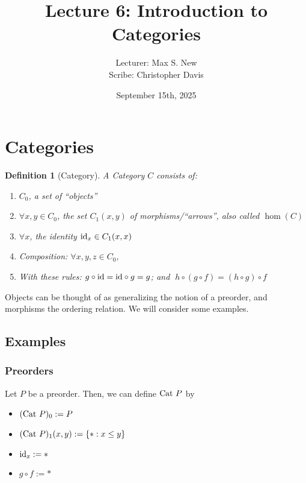 \documentclass[12pt]{article}
\newtheorem{definition}{Definition}
\begin{document}
\title{Lecture 6: Introduction to Categories}
\author{Lecturer: Max S. New\\ Scribe: Christopher Davis}
\date{September 15th, 2025}
\maketitle



\section{Categories}

\begin{definition}[Category]
A Category $C$ consists of:
\begin{enumerate}
    \item $C_0$, a set of ``objects''
    \item $\forall x,y \in C_0$, the set $C_1(x,y)$ of morphisms/``arrows'', also called $\hom(C)$
    \item $\forall x$, the identity $\text{\textup{id}}_x \in C_1(x,x)$
    \item Composition: $\forall x,y,z \in C_0$,
    \begin{mathpar}
    \end{mathpar}
    \item With these rules: $g \circ \textup{id} = \textup{id} \circ g = g$; and $\;h \circ (g \circ f) = (h \circ g) \circ f$
\end{enumerate}

\end{definition}

Objects can be thought of as generalizing the notion of a preorder, and morphisms the ordering relation. We will consider some examples.


\subsection{Examples}

\subsubsection{Preorders}
Let $P$ be a preorder. Then, we can define $\textmd{Cat } P$ by

\begin{itemize}
    \item $(\textmd{Cat } P)_0 := P$
    \item $(\textmd{Cat } P)_1(x,y) := \{ \ast : x \leq y \}$
    \item $\textmd{id}_x := \ast$
    \item $g \circ f := \ast$
\end{itemize}
\end{document}
